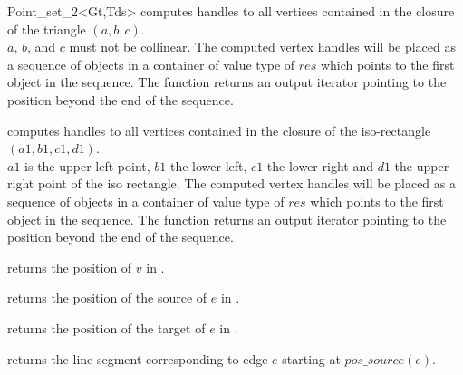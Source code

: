 \begin{ccRefClass}{Point_set_2<Gt,Tds>}
{ computes handles to all vertices contained in the closure of the triangle $(a,b,c)$.\\
\ccPrecond $a$, $b$, and $c$ must not be collinear. 
The computed vertex handles will be placed as a sequence of objects in a container of value type
of $res$
which points to the first object in the sequence. The function
returns an output iterator pointing to the position beyond the end
of the sequence.
}

{ computes handles to all vertices contained in the closure of the iso-rectangle $(a1,b1,c1,d1)$.\\
\ccPrecond $a1$ is the upper left point, $b1$ the lower left, $c1$ the lower
right and $d1$ the upper right point of the iso rectangle.
The computed vertex handles will be placed as a sequence of objects in a container of value type
of $res$
which points to the first object in the sequence. The function
returns an output iterator pointing to the position beyond the end
of the sequence.
}

{ returns the position of $v$ in \ccVar.}
    
{ returns the position of the source of $e$ in \ccVar.}
   
{ returns the position of the target of $e$ in \ccVar.}
    
{ returns the line segment corresponding to edge $e$ starting
at $pos\_source(e)$.}
   

\ccHtmlLinksOn

\end{ccRefClass} 
